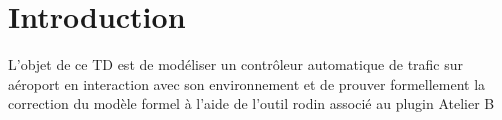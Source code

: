 
\pagebreak

\section*{Introduction}

 L'objet de ce TD est de modéliser un contrôleur automatique de trafic sur aéroport en interaction avec son environnement et de prouver formellement 
 la correction du modèle formel à l'aide de l'outil rodin associé au plugin Atelier B
 
 




